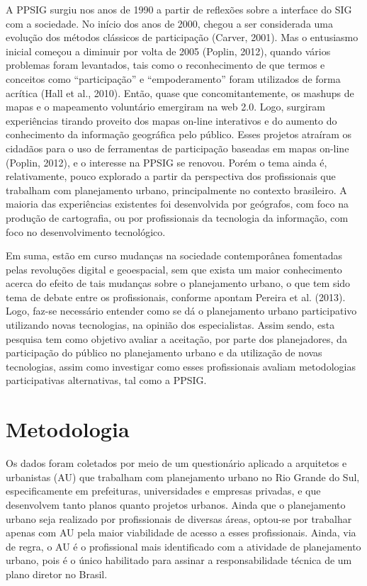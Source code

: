 \documentclass{article}
\begin{document}
A PPSIG surgiu nos anos de 1990 a partir de reflexões sobre a interface do SIG
com a
sociedade. No início dos anos de 2000, chegou a ser considerada uma evolução dos
métodos clássicos de participação (Carver,
2001). Mas o entusiasmo inicial começou a diminuir por volta de 2005
(Poplin, 2012), quando vários problemas
foram levantados, tais como o reconhecimento de que termos e conceitos como
“participação” e “empoderamento” foram utilizados de forma acrítica (Hall et
al., 2010). Então, quase que
concomitantemente, os mashups de mapas e o mapeamento voluntário
emergiram na web 2.0. Logo, surgiram experiências tirando proveito dos mapas
on-line
interativos e do aumento do conhecimento da informação geográfica pelo público.
Esses projetos atraíram os cidadãos para o uso de ferramentas de participação
baseadas em mapas on-line (Poplin, 2012), e
o interesse na PPSIG se renovou. Porém o tema ainda é, relativamente, pouco
explorado a partir da perspectiva dos profissionais que trabalham com
planejamento
urbano, principalmente no contexto brasileiro. A maioria das experiências
existentes
foi desenvolvida por geógrafos, com foco na produção de cartografia, ou por
profissionais da tecnologia da informação, com foco no desenvolvimento
tecnológico.

Em suma, estão em curso mudanças na sociedade contemporânea fomentadas pelas
revoluções digital e geoespacial, sem que exista um maior conhecimento acerca do
efeito de tais mudanças sobre o planejamento urbano, o que tem sido tema de
debate
entre os profissionais, conforme apontam Pereira et
al. (2013). Logo, faz-se necessário entender como se dá o planejamento
urbano participativo utilizando novas tecnologias, na opinião dos especialistas.
Assim sendo, esta pesquisa tem como objetivo avaliar a aceitação, por parte dos
planejadores, da participação do público no planejamento urbano e da utilização
de
novas tecnologias, assim como investigar como esses profissionais avaliam
metodologias participativas alternativas, tal como a PPSIG.

\section{Metodologia}

Os dados foram coletados por meio de um questionário aplicado a arquitetos e
urbanistas (AU) que trabalham com planejamento urbano no Rio Grande do Sul,
especificamente em prefeituras, universidades e empresas privadas, e que
desenvolvem
tanto planos quanto projetos urbanos. Ainda que o planejamento urbano seja
realizado
por profissionais de diversas áreas, optou-se por trabalhar apenas com AU pela
maior
viabilidade de acesso a esses profissionais. Ainda, via de regra, o AU é o
profissional mais identificado com a atividade de planejamento urbano, pois é o
único habilitado para assinar a responsabilidade técnica de um plano diretor no
Brasil.
\end{document}
